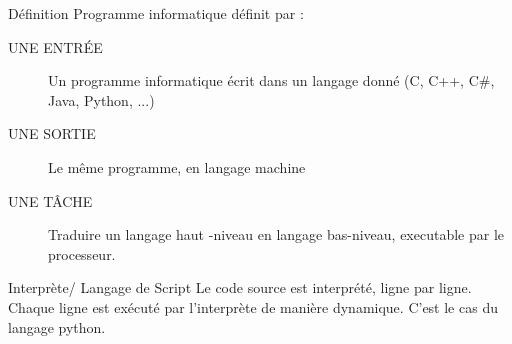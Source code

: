 \begin{frame}{Définition}
    Programme informatique définit par :
    \begin{description}
        \item [UNE ENTRÉE] Un programme informatique écrit dans un langage donné (C, C++, C\#, Java, Python, ...)
        \item []
        \item [UNE SORTIE] Le même programme, en langage machine
        \item []
        \item [UNE TÂCHE] Traduire un langage haut -niveau en langage bas-niveau, executable par le processeur.
    \end{description}
\end{frame}

\begin{frame}{Interprète/ Langage de Script}
    Le code source est interprété, ligne par ligne.\\
    Chaque ligne est exécuté par l'interprète de manière dynamique.
    C'est le cas du langage python.
\end{frame}
